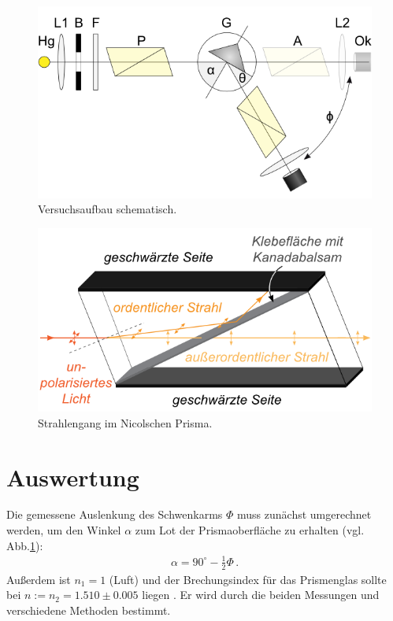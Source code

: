 \documentclass[12pt,a4paper,titlepage,headinclude,bibtotoc]{scrartcl}
\begin{document}
\begin{figure}[!h]
	\centering
	\includegraphics[scale=0.7]{aufbau_schema.png}
	\caption{Versuchsaufbau schematisch. \cite[Datum: 23.03.2015]{LP20}}
	\label{fig:aufbau}
\end{figure}
\begin{figure}[!h]
	\centering
	\includegraphics[scale=0.7]{nicol.png}
	\caption{Strahlengang im Nicolschen Prisma. \cite[Datum: 23.03.2015]{LP20}}
	\label{fig:nicol}
\end{figure}

\section{Auswertung}
\label{sec:auswertung}
Die gemessene Auslenkung des Schwenkarms $\Phi$ muss zunächst umgerechnet werden, um den Winkel $\alpha$ zum Lot der Prismaoberfläche zu erhalten (vgl. Abb.\ref{fig:aufbau}):\\
\begin{align}
	\alpha=90^\circ-\frac{1}{2}\Phi\,.
\end{align}
Außerdem ist $n_1=1$ (Luft) und der Brechungsindex für das Prismenglas sollte bei $n := n_2=1.510 \pm 0.005$ liegen \cite[S.181]{prakti}.
Er wird durch die beiden Messungen und verschiedene Methoden bestimmt.
\end{document}
